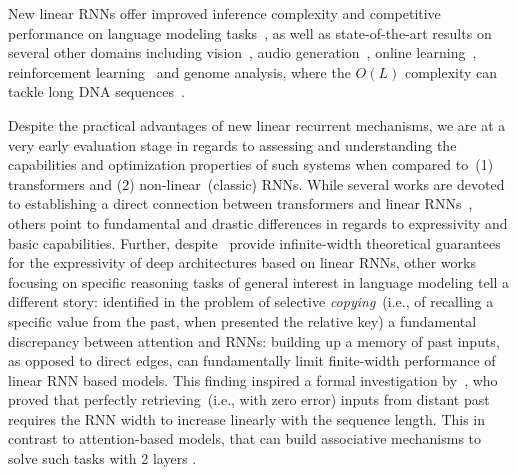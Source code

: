 New linear RNNs offer improved inference complexity and competitive performance on language modeling tasks~\citep{dao2024transformers,waleffe2024empirical}, as well as state-of-the-art results on several other domains including vision~\citep{liu2024vmamba,li2025videomamba, liang2024pointmamba, xing2024segmamba}, audio generation~\citep{goel2022sashimi}, online learning~\citep{zucchet2023online}, reinforcement learning~\citep{lu2023structured} and genome analysis, where the $O(L)$ complexity can tackle long DNA sequences~\citep{nguyen2024sequence}. 


Despite the practical advantages of new linear recurrent mechanisms, we are at a very early evaluation stage in regards to assessing and understanding the capabilities and optimization properties of such systems when compared to~(1) transformers and (2) non-linear~(classic) RNNs. While several works are devoted to establishing a direct connection between transformers and linear RNNs~\citep{katharopoulos2020transformers, schlag2021linear, ali2024hidden, sieber2024understanding}, others point to fundamental and drastic differences in regards to expressivity and basic capabilities. Further, despite~\citet{orvieto2024universality,wang2024state, cirone2024theoretical} provide infinite-width theoretical guarantees for the expressivity of deep architectures based on linear RNNs, other works focusing on specific reasoning tasks of general interest in language modeling tell a different story: \cite{arora2023zoology} identified in the problem of selective \textit{copying}~(i.e., of recalling a specific value from the past, when presented the relative key) a fundamental discrepancy between attention and RNNs: building up a memory of past inputs, as opposed to direct edges, can fundamentally limit finite-width performance of linear RNN based models. This finding inspired a formal investigation by~\cite{jelassi2024repeat}, who proved that perfectly retrieving~(i.e., with zero error) inputs from distant past requires the RNN width to increase linearly with the sequence length. This in contrast to attention-based models, that can build associative mechanisms to solve such tasks with 2 layers \citep[cf.][]{olsson2022context}.


